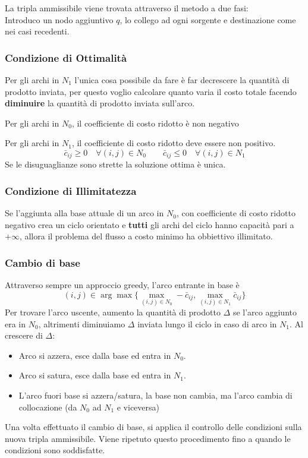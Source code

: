 \documentclass[../template]{subfiles}
\begin{document}
La tripla ammissibile viene trovata attraverso il metodo a due fasi:
\\
Introduco un nodo aggiuntivo $q$, lo collego ad ogni sorgente e destinazione come nei casi recedenti.

\subsubsection{Condizione di Ottimalità}
Per gli archi in $N_1$ l'unica cosa possibile da fare è far decrescere la quantità di prodotto inviata, per questo voglio
calcolare quanto varia il costo totale facendo \textbf{diminuire} la quantità di prodotto inviata sull'arco.

Per gli archi in $N_0$, il coefficiente di costo ridotto è non negativo

Per gli archi in $N_1$, il coefficiente di costo ridotto deve essere non positivo.
\[
    \bar{c}_{ij} \ge 0 \quad \forall (i, j) \in N_0  \qquad \bar{c}_{ij} \le 0 \quad \forall (i, j) \in N_1
\]
Se le disuguaglianze sono strette la soluzione ottima è unica.
\subsubsection{Condizione di Illimitatezza}
Se l'aggiunta alla base attuale di un arco in $N_0$, con coefficiente di costo ridotto negativo crea un ciclo orientato
e \textbf{tutti} gli archi del ciclo hanno capacità pari a $+\infty$, allora il problema del flusso a costo minimo ha obbiettivo
illimitato.

\subsubsection{Cambio di base}
Attraverso sempre un approccio greedy, l'arco entrante in base è
\[
    (i, j) \in \arg\max\big\{ \max_{(i, j) \in N_0} -\bar{c}_{ij}, \max_{(i, j) \in N_1} \bar{c}_{ij}\big\}
\]
Per trovare l'arco uscente, aumento la quantità di prodotto $\Delta$ se l'arco aggiunto era in $N_0$, altrimenti diminuiamo
$\Delta$ inviata lungo il ciclo in caso di arco in $N_1$.
Al crescere di $\Delta$:
\begin{itemize}
    \item Arco si azzera, esce dalla base ed entra in $N_0$.
    \item Arco si satura, esce dalla base ed entra in $N_1$.
    \item L'arco fuori base si azzera/satura, la base non cambia, ma l'arco cambia di collocazione (da $N_0$ ad $N_1$ e viceversa)
\end{itemize}
Una volta effettuato il cambio di base, si applica il controllo delle condizioni sulla nuova tripla ammissibile.
Viene ripetuto questo procedimento fino a quando le condizioni sono soddisfatte.
\end{document}
